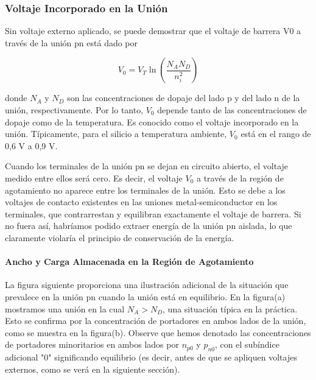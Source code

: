 \subsubsection{Voltaje Incorporado en la Unión} Sin voltaje externo aplicado, se puede demostrar que el voltaje de barrera V0 a través de la unión pn está dado por

\begin{equation*}
V_0 = V_T \ln{\left(\frac{N_A N_D}{n_i^2}\right)}
\end{equation*}

donde \(N_A\) y \(N_D\) son las concentraciones de dopaje del lado p y del lado n de la unión, respectivamente. Por lo tanto, \(V_0\) depende tanto de las concentraciones de dopaje como de la temperatura. Es conocido como el voltaje incorporado en la unión. Típicamente, para el silicio a temperatura ambiente, \(V_0\) está en el rango de 0,6 V a 0,9 V.

Cuando los terminales de la unión pn se dejan en circuito abierto, el voltaje medido entre ellos será cero. Es decir, el voltaje \(V_0\) a través de la región de agotamiento no aparece entre los terminales de la unión. Esto se debe a los voltajes de contacto existentes en las uniones metal-semiconductor en los terminales, que contrarrestan y equilibran exactamente el voltaje de barrera. Si no fuera así, habríamos podido extraer energía de la unión pn aislada, lo que claramente violaría el principio de conservación de la energía.

\paragraph*{Ancho y Carga Almacenada en la Región de Agotamiento} La figura siguiente proporciona una ilustración adicional de la situación que prevalece en la unión pn cuando la unión está en equilibrio. En la figura(a) mostramos una unión en la cual \(N_A > N_D\), una situación típica en la práctica. Esto se confirma por la concentración de portadores en ambos lados de la unión, como se muestra en la figura(b). Observe que hemos denotado las concentraciones de portadores minoritarios en ambos lados por \(n_{p0}\) y \(p_{n0}\), con el subíndice adicional "0" significando equilibrio (es decir, antes de que se apliquen voltajes externos, como se verá en la siguiente sección). 

